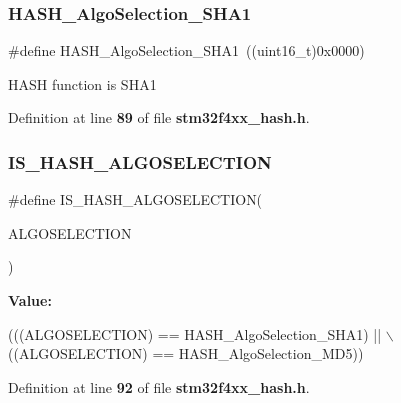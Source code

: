 \subsubsection{H\+A\+S\+H\+\_\+\+Algo\+Selection\+\_\+\+S\+H\+A1}
{\footnotesize\ttfamily \#define H\+A\+S\+H\+\_\+\+Algo\+Selection\+\_\+\+S\+H\+A1~((uint16\+\_\+t)0x0000)}

H\+A\+SH function is S\+H\+A1 

Definition at line \textbf{ 89} of file \textbf{ stm32f4xx\+\_\+hash.\+h}.

\mbox{\label{group__HASH__Algo__Selection_ga9468e8db1412a30864ec7991acd8202a}} 
\subsubsection{I\+S\+\_\+\+H\+A\+S\+H\+\_\+\+A\+L\+G\+O\+S\+E\+L\+E\+C\+T\+I\+ON}
{\footnotesize\ttfamily \#define I\+S\+\_\+\+H\+A\+S\+H\+\_\+\+A\+L\+G\+O\+S\+E\+L\+E\+C\+T\+I\+ON(\begin{DoxyParamCaption}\item[{}]{A\+L\+G\+O\+S\+E\+L\+E\+C\+T\+I\+ON }\end{DoxyParamCaption})}

{\bfseries Value\+:}
\begin{DoxyCode}
(((ALGOSELECTION) == HASH_AlgoSelection_SHA1) || \(\backslash\)
                                              ((ALGOSELECTION) == 
      HASH_AlgoSelection_MD5))
\end{DoxyCode}


Definition at line \textbf{ 92} of file \textbf{ stm32f4xx\+\_\+hash.\+h}.

